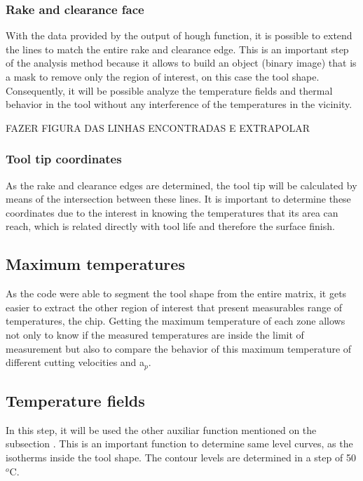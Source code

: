 		\subsubsection{Rake and clearance face}

		With the data provided by the output of hough function, it is possible to extend the lines to match the entire rake and clearance edge. This is an important step of the analysis method because it allows to build an object (binary image) that is a mask to remove only the region of interest, on this case the tool shape. Consequently, it will be possible analyze the temperature fields and thermal behavior in the tool without any interference of the temperatures in the vicinity.

		FAZER FIGURA DAS LINHAS ENCONTRADAS E EXTRAPOLAR

		\subsubsection{Tool tip coordinates}

		As the rake and clearance edges are determined, the tool tip will be calculated by means of the intersection between these lines. It is important to determine these coordinates due to the interest in knowing the temperatures that its area can reach, which is related directly with tool life and therefore the surface finish.

	\subsection{Maximum temperatures}

	As the code were able to segment the tool shape from the entire matrix, it gets easier to extract the other region of interest that present measurables range of temperatures, the chip. Getting the maximum temperature of each zone allows not only to know if the measured temperatures are inside the limit of measurement but also to compare the behavior of this maximum temperature of different cutting velocities and a$_{p}$.

	\subsection{Temperature fields}

	In this step, it will be used the other auxiliar function mentioned on the subsection . This is an important function to determine same level curves, as the isotherms inside the tool shape. The contour levels are determined in a step of 50 $^{o}$C.

